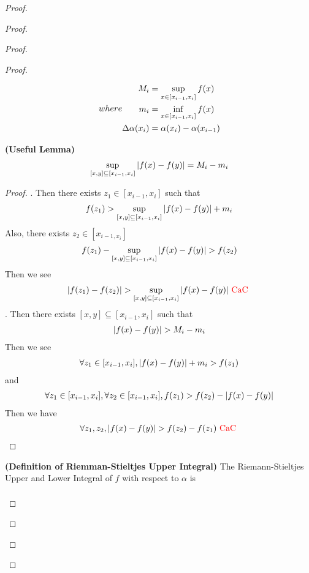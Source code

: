 \documentclass{report}
\begin{document}
\begin{proof}
\begin{proof}
\begin{proof}
\begin{proof}
\begin{definition}
\begin{align*}
\end{align}
where 
\begin{align*}
  M_i&=\sup_{x\in [x_{i-1},x_i]}f(x)\\
m_i&=\inf_{x\in [x_{i-1},x_i]}f(x)\\
\Delta \alpha (x_i)&=\alpha (x_i)-\alpha (x_{i-1})
\end{align*}
\end{definition}
\begin{theorem}
\label{7.1.7}
\textbf{(Useful Lemma)} 
\begin{align*}
\sup_{[x,y]\subseteq [x_{i-1},x_i]}|f(x)-f(y)|= M_i-m_i
\end{align*}
\end{theorem}
\begin{proof}
. Then there exists $z_1\in [x_{i-1},x_i]$ such that 
\begin{align*}
f(z_1)>\sup_{[x,y]\subseteq [x_{i-1},x_i]}|f(x)-f(y)|+m_i
\end{align*}
Also, there exists $z_2\in [x_{i-1,x_i}]$
\begin{align*}
f(z_1)-\sup_{[x,y]\subseteq [x_{i-1},x_i]}\abso{f(x)-f(y)}>f(z_2)
\end{align*}
Then we see 
\begin{align*}
\abso{f(z_1)-f(z_2)}>\sup_{[x,y]\subseteq [x_{i-1},x_i]}\abso{f(x)-f(y)}\tCaC
\end{align*}
. Then there exists $[x,y]\subseteq [x_{i-1},x_i]$ such that 
\begin{align*}
\abso{f(x)-f(y)}> M_i-m_i
\end{align*}
Then we see 
\begin{align*}
\forall z_1\in [x_{i-1},x_i], |f(x)-f(y)|+m_i>f(z_1)
\end{align*}
and 
\begin{align*}
\forall z_1\in [x_{i-1},x_i],\forall z_2\in [x_{i-1},x_i], f(z_1)>f(z_2)-|f(x)-f(y)|
\end{align*}
Then we have 
\begin{align*}
\forall z_1,z_2, \abso{f(x)-f(y)}>f(z_2)-f(z_1)\tCaC
\end{align*}
\end{proof}
\begin{definition}
\label{7.1.8}
\textbf{(Definition of Riemman-Stieltjes Upper Integral)} The Riemann-Stieltjes Upper and Lower Integral of $f$ with respect to $\alpha $ is 
\begin{align*}

\end{align*}
\end{definition}
\end{proof}
\end{proof}
\end{proof}
\end{proof}
\end{document}

